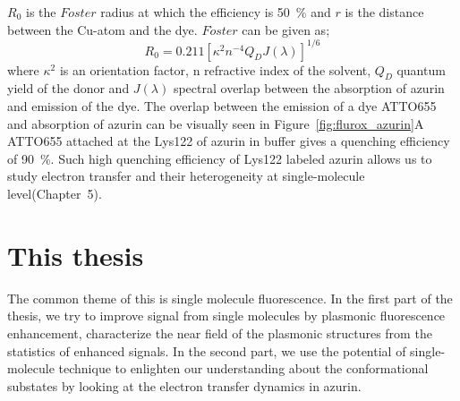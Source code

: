 $R_0$ is the $F\ddot{o}ster$ radius at which the efficiency is \SI{50}{\percent} and $r$ is the distance between the Cu-atom and the dye.
$F\ddot{o}ster$ can be given as;
\begin{equation}
	R_0 = 0.211[\kappa^2n^{-4}Q_DJ(\lambda)]^{1/6}	
\end{equation}
where $\kappa^2$ is an orientation factor, n refractive index of the solvent, $Q_D$ quantum yield of the donor and $J(\lambda)$ spectral overlap between the absorption of azurin and emission of the dye.
The overlap between the emission of a dye ATTO655 and absorption of azurin can be visually seen in Figure~\ref{fig:flurox_azurin}A
ATTO655 attached at the Lys122 of azurin in buffer gives a quenching efficiency of \SI{90}{\percent}.
Such high quenching efficiency of Lys122 labeled azurin allows us to study electron transfer and their heterogeneity at single-molecule level(Chapter~5).

\section{This thesis}
The common theme of this is single molecule fluorescence. In the first part of the thesis, we try to improve signal from single molecules by plasmonic fluorescence enhancement, characterize the near field of the plasmonic structures from the statistics of enhanced signals. In the second part, we use the potential of single-molecule technique to enlighten our understanding about the conformational substates by looking at the electron transfer dynamics in azurin.

